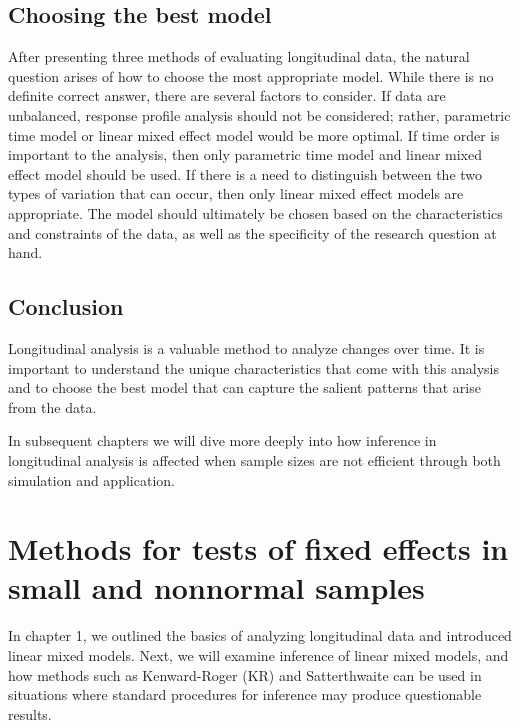 \documentclass[12pt, twoside]{amherstthesis}
\begin{document}
\hypertarget{choosing-the-best-model}{%
\section{Choosing the best model}\label{choosing-the-best-model}}

After presenting three methods of evaluating longitudinal data, the natural question arises of how to choose the most appropriate model. While there is no definite correct answer, there are several factors to consider. If data are unbalanced, response profile analysis should not be considered; rather, parametric time model or linear mixed effect model would be more optimal. If time order is important to the analysis, then only parametric time model and linear mixed effect model should be used. If there is a need to distinguish between the two types of variation that can occur, then only linear mixed effect models are appropriate. The model should ultimately be chosen based on the characteristics and constraints of the data, as well as the specificity of the research question at hand.

\hypertarget{conclusion}{%
\section{Conclusion}\label{conclusion}}

Longitudinal analysis is a valuable method to analyze changes over time. It is important to understand the unique characteristics that come with this analysis and to choose the best model that can capture the salient patterns that arise from the data.

In subsequent chapters we will dive more deeply into how inference in longitudinal analysis is affected when sample sizes are not efficient through both simulation and application.

\hypertarget{rmd-basics}{%
\chapter{Methods for tests of fixed effects in small and nonnormal samples}\label{rmd-basics}}

In chapter 1, we outlined the basics of analyzing longitudinal data and introduced linear mixed models. Next, we will examine inference of linear mixed models, and how methods such as Kenward-Roger (KR) and Satterthwaite can be used in situations where standard procedures for inference may produce questionable results.
\end{document}
